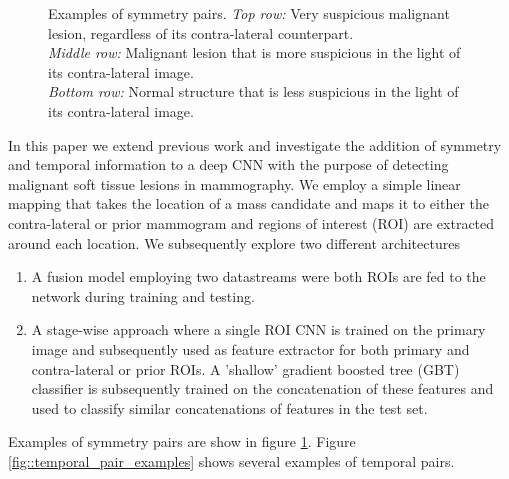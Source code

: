 \documentclass[12pt]{spieman}  %
\begin{document}
\begin{figure}
  \centering
  \hspace{0.5cm}

  \hspace{0.5cm}
  
  \hspace{0.5cm}

  \caption{Examples of symmetry pairs. {\it Top row:} Very suspicious malignant lesion, regardless of its contra-lateral counterpart. \\
  {\it Middle row:} Malignant lesion that is more suspicious in the light of its contra-lateral image. \\
  {\it Bottom row:} Normal structure that is less suspicious in the light of its contra-lateral image. }
  \label{fig::symmetry_pair_examples}
\end{figure}

In this paper we extend previous work \cite{Kooi17b} and investigate the addition of symmetry and temporal information to a deep CNN with the purpose of detecting malignant soft tissue lesions in mammography. We employ a simple linear mapping that takes the location of a mass candidate and maps it to either the contra-lateral or prior mammogram and regions of interest (ROI) are extracted around each location. We subsequently explore two different architectures
\begin{enumerate}
 \item A fusion model employing two datastreams were both ROIs are fed to the network during training and testing.
 \item A stage-wise approach where a single ROI CNN is trained on the primary image and subsequently used as feature extractor for both primary and contra-lateral or prior ROIs. A 'shallow' gradient boosted tree (GBT) classifier is subsequently trained on the concatenation of these features and used to classify similar concatenations of features in the test set. 
\end{enumerate}
Examples of symmetry pairs are show in figure \ref{fig::symmetry_pair_examples}. Figure \ref{fig::temporal_pair_examples} shows several examples of temporal pairs. \\
\end{document}
